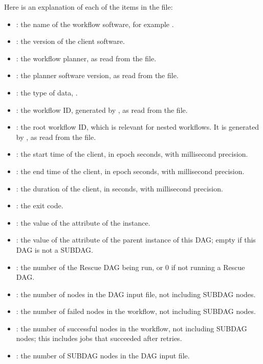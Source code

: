Here is an explanation of each of the items in the file:
\begin{itemize}
\item {}: the name of the workflow software,
for example .
\item {}: the version of the client software.
\item {}: the workflow planner, 
as read from the  file.
\item {}: the planner software version,
as read from the  file.
\item {}: the type of data,  .
\item {}: the workflow ID, 
generated by , as read from the  file.
\item {}: the root workflow ID,
which is relevant for nested workflows. 
It is generated by , 
as read from the  file.
\item {}: the start time of the client,
in epoch seconds, with millisecond precision.
\item {}: the end time of the client,
in epoch seconds, with millisecond precision.
\item {}: the duration of the client,
in seconds, with millisecond precision.
\item {}: the  exit code.
\item {}: the value of the  attribute 
of the  instance.
\item {}: the value of the  attribute 
of the parent  instance of this DAG;
empty if this DAG is not a SUBDAG.
\item {}: the number of the Rescue DAG being run,
or 0 if not running a Rescue DAG.
\item {}: the number of nodes in the DAG input file,
not including SUBDAG nodes.
\item {}: the number of failed nodes in the workflow,
not including SUBDAG nodes.
\item {}: the number of successful nodes in the
workflow, not including SUBDAG nodes; 
this includes jobs that succeeded after retries.
\item {}: the number of SUBDAG nodes in the DAG input file.

\end{itemize}
